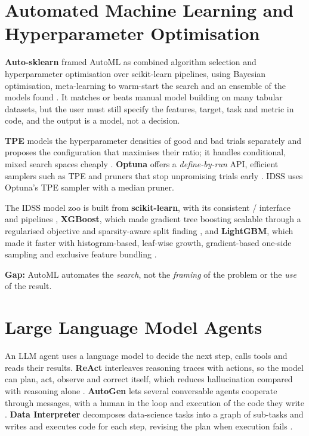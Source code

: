 \FloatBarrier
\section{Automated Machine Learning and Hyperparameter Optimisation}\label{sec:2.2}

\textbf{Auto-sklearn} framed AutoML as combined algorithm selection and hyperparameter optimisation over scikit-learn pipelines, using Bayesian optimisation, meta-learning to warm-start the search and an ensemble of the models found \cite{ref5}. It matches or beats manual model building on many tabular datasets, but the user must still specify the features, target, task and metric in code, and the output is a model, not a decision.

\textbf{TPE} models the hyperparameter densities of good and bad trials separately and proposes the configuration that maximises their ratio; it handles conditional, mixed search spaces cheaply \cite{ref6}. \textbf{Optuna} offers a \textit{define-by-run} API, efficient samplers such as TPE and pruners that stop unpromising trials early \cite{ref7}. IDSS uses Optuna's TPE sampler with a median pruner.

The IDSS model zoo is built from \textbf{scikit-learn}, with its consistent  /  interface and pipelines \cite{ref2}, \textbf{XGBoost}, which made gradient tree boosting scalable through a regularised objective and sparsity-aware split finding \cite{ref3}, and \textbf{LightGBM}, which made it faster with histogram-based, leaf-wise growth, gradient-based one-side sampling and exclusive feature bundling \cite{ref4}.

\textbf{Gap:} AutoML automates the \textit{search}, not the \textit{framing} of the problem or the \textit{use} of the result.

\FloatBarrier
\section{Large Language Model Agents}\label{sec:2.3}

An LLM agent uses a language model to decide the next step, calls tools and reads their results. \textbf{ReAct} interleaves reasoning traces with actions, so the model can plan, act, observe and correct itself, which reduces hallucination compared with reasoning alone \cite{ref8}. \textbf{AutoGen} lets several conversable agents cooperate through messages, with a human in the loop and execution of the code they write \cite{ref12}. \textbf{Data Interpreter} decomposes data-science tasks into a graph of sub-tasks and writes and executes code for each step, revising the plan when execution fails \cite{ref13}.


